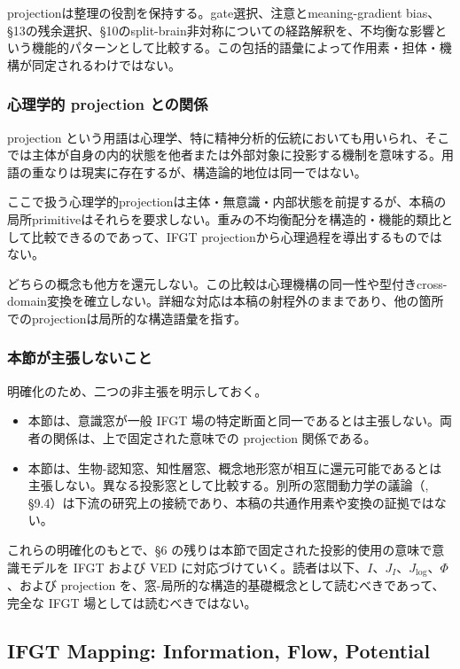 projectionは整理の役割を保持する。gate選択、注意とmeaning-gradient bias、§13の残余選択、§10のsplit-brain非対称についての経路解釈を、不均衡な影響という機能的パターンとして比較する。この包括的語彙によって作用素・担体・機構が同定されるわけではない。

\subsubsection{心理学的 projection との関係}
\label{sec:projection-disclaimer}

projection という用語は心理学、特に精神分析的伝統においても用いられ、そこでは主体が自身の内的状態を他者または外部対象に投影する機制を意味する。用語の重なりは現実に存在するが、構造論的地位は同一ではない。

ここで扱う心理学的projectionは主体・無意識・内部状態を前提するが、本稿の局所primitiveはそれらを要求しない。重みの不均衡配分を構造的・機能的類比として比較できるのであって、IFGT projectionから心理過程を導出するものではない。

どちらの概念も他方を還元しない。この比較は心理機構の同一性や型付きcross-domain変換を確立しない。詳細な対応は本稿の射程外のままであり、他の箇所でのprojectionは局所的な構造語彙を指す。

\subsubsection{本節が主張しないこと}
\label{sec:projected-uses-non-claims}

明確化のため、二つの非主張を明示しておく。

\begin{itemize}
\item 本節は、意識窓が一般 IFGT 場の特定断面と同一であるとは主張しない。両者の関係は、上で固定された意味での projection 関係である。
\item 本節は、生物-認知窓、知性層窓、概念地形窓が相互に還元可能であるとは主張しない。異なる投影窓として比較する。別所の窓間動力学の議論（\cite{Intelligence}, §9.4）は下流の研究上の接続であり、本稿の共通作用素や変換の証拠ではない。
\end{itemize}

これらの明確化のもとで、§6 の残りは本節で固定された投影的使用の意味で意識モデルを IFGT および VED に対応づけていく。読者は以下、$I$、$J_I$、$J_{\log}$、$\Phi$、および projection を、窓-局所的な構造的基礎概念として読むべきであって、完全な IFGT 場としては読むべきではない。

\subsection{IFGT Mapping: Information, Flow, Potential}


